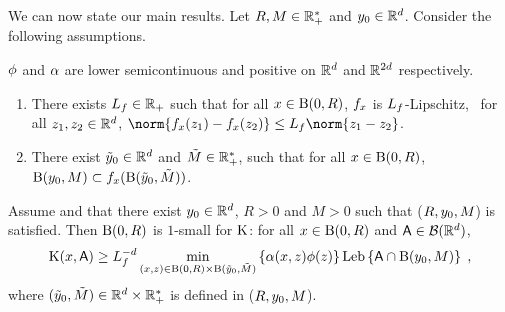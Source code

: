 We can now state our main results. Let $R,M \in \mathbb{R}^*_+$ and $y_0 \in \mathbb{R}^d$.
Consider the following assumptions.
\begin{assumptionG}
\label{assumG:phi}
$\phi$ and $\alpha$ are lower semicontinuous and positive on $\mathbb{R}^d$ and $\mathbb{R}^{2d}$ respectively.
\end{assumptionG}


\begin{assumptionG}
  \label{assumG:irred_b}
  \begin{enumerate}[label=(\roman*), wide, labelwidth=!, labelindent=0pt]
  \item \label{assumG:irred_b_item_i} There exists $L_{f} \in \mathbb{R}_+$ such that for all $x \in \operatorname{B}(0,R)$, $f_x$ is
    $L_{f}$-Lipschitz, \ie~for all $z_1,z_2 \in \mathbb{R}^d$,
    $\norm{\hfunb_x(z_1)-\hfunb_x(z_2)} \leq \constLiphx
    \norm{z_1-z_2}$.
\item \label{assumG:irred_b_item_ii} There exist $\tilde{y}_0 \in \mathbb{R}^d$ and $\tilde{M} \in \mathbb{R}_+^*$,
  such that for all $x \in \operatorname{B}(0,R)$, $\operatorname{B}(y_0,M) \subset f_x(\operatorname{B}(\tilde{y}_0,\tilde{M}))$.
  \end{enumerate}
\end{assumptionG}


\begin{theorem}
\label{theo:irred}
Assume  and that there exist $y_0 \in \mathbb{R}^d$, $R > 0$ and $M > 0$ such that ($R,y_0,M$)  is satisfied. Then $\operatorname{B}(0,R)$ is $1$-small for $\mathrm{K}$: for all $x \in \operatorname{B}(0,R)$ and $\mathsf{A} \in \mathcal{B}(\mathbb{R}^d)$,
  \begin{equation}
    \mathrm{K}(x,\mathsf{A}) \geq L_{f}^{-d} \min_{(x,z) \in \operatorname{B}(0,R) \times \operatorname{B}(\tilde{y}_0,\tilde{M})} \left\lbrace \alpha(x,z) \phi(z) \right\rbrace \operatorname{Leb}\left\lbrace \mathsf{A} \cap \operatorname{B}(y_0,M) \right\rbrace \;,
  \end{equation}
where $(\tilde{y}_0,\tilde{M}) \in \mathbb{R}^d \times \mathbb{R}_+^*$ is defined in ($R,y_0,M$).
\end{theorem}

